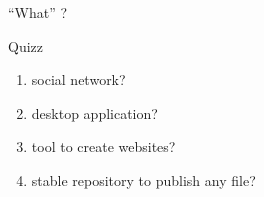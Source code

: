 \begin{frame}{ “What” ?}
\begin{block}{Quizz}
\begin{enumerate}
    \item social network?
    \item desktop application?
    \item tool to create websites?
    \item stable repository to publish any file?
\end{enumerate}
\end{block}
\end{frame}
